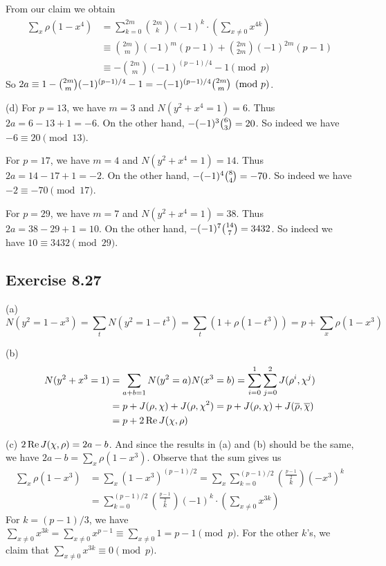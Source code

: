 \documentclass[../I&R.tex]{subfiles}
\begin{document}
From our claim we obtain
\begin{align*}
    \sum_x \rho(1-x^4) &= \sum_{k=0}^{2m}\binom{2m}{k}(-1)^k\cdot\left(\sum_{x\neq0} x^{4k}\right) \\
    &\equiv \binom{2m}{m}(-1)^{m}(p-1)+\binom{2m}{2m}(-1)^{2m}(p-1) \\
    &\equiv -\binom{2m}{m}(-1)^{(p-1)/4} - 1 \pmod{p}
\end{align*}
So $2a\equiv 1-\tbinom{2m}{m}(-1)^{(p-1)/4}-1 = -(-1)^{(p-1)/4}\tbinom{2m}{m} \pmod{p}$.

(d) For $p=13$, we have $m=3$ and $N(y^2+x^4=1)=6$. Thus $2a=6-13+1=-6$. On the other hand, $-(-1)^3\tbinom{6}{3}=20$. So indeed we have $-6\equiv20\pmod{13}$.

For $p=17$, we have $m=4$ and $N(y^2+x^4=1)=14$. Thus $2a=14-17+1=-2$. On the other hand, $-(-1)^4\tbinom{8}{4}=-70$. So indeed we have $-2\equiv-70\pmod{17}$.

For $p=29$, we have $m=7$ and $N(y^2+x^4=1)=38$. Thus $2a=38-29+1=10$. On the other hand, $-(-1)^7\tbinom{14}{7}=3432$. So indeed we have $10\equiv3432\pmod{29}$.

\subsection*{Exercise 8.27}

(a) $$N(y^2=1-x^3) = \sum_t N(y^2=1-t^3) = \sum _t (1+\rho(1-t^3)) = p+\sum_x \rho(1-x^3)$$

(b) \begin{align*}
    N(y^2+x^3=1) &= \sum_{a+b=1} N(y^2=a)N(x^3=b) = \sum_{i=0}^1\sum_{j=0}^2 J(\rho^i,\chi^j) \\
    &= p+J(\rho,\chi)+J(\rho,\chi^2) = p+J(\rho,\chi)+J(\overline{\rho},\overline{\chi}) \\
    &= p+2\operatorname{Re} J(\chi,\rho)
\end{align*}

(c) $2\operatorname{Re} J(\chi,\rho)=2a-b$. And since the results in (a) and (b) should be the same, we have $2a-b=\sum_x \rho(1-x^3)$. Observe that the sum gives us
\begin{align*}
    \sum_x \rho(1-x^3) &= \sum_x (1-x^3)^{(p-1)/2} = \sum_x \sum_{k=0}^{(p-1)/2} \binom{\frac{p-1}{2}}{k}(-x^3)^k \\
    &= \sum_{k=0}^{(p-1)/2}\binom{\frac{p-1}{2}}{k}(-1)^k\cdot\left(\sum_{x\neq0} x^{3k}\right)
\end{align*}
For $k=(p-1)/3$, we have $\sum_{x\neq0} x^{3k} = \sum_{x\neq0} x^{p-1} \equiv\sum_{x\neq0} 1 = p-1 \pmod{p}$. For the other $k$'s, we claim that $\sum_{x\neq0} x^{3k}\equiv0\pmod{p}$.
\end{document}

